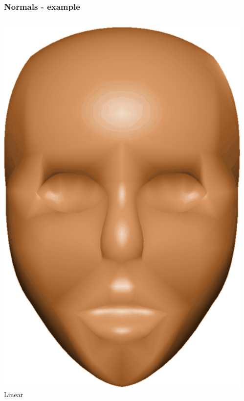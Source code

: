 	\begin{frame}\frametitle{Normals - example}
		\begin{columns}
			\begin{column}{0.4\textwidth}
			\begin{center}
					\includegraphics[width=\textwidth]{img/1_single/linearlyVaryingNormals.png}
					\small{Linear}
				\end{center}	
			\end{column}
			\begin{column}{0.4\textwidth}
			\begin{center}

\end{center}
\end{column}
\end{columns}
\end{frame}
